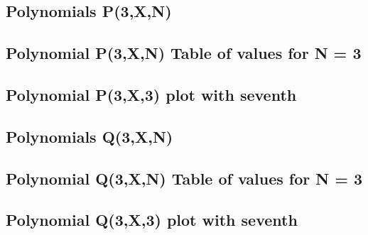 \documentclass[12pt,letterpaper,oneside,reqno]{amsart}
\begin{document}
    \subsection{Polynomials P(3,X,N)}
    

    \subsection{Polynomial P(3,X,N) Table of values for N = 3}
    

    \subsection{Polynomial P(3,X,3) plot with seventh}
    

    \subsection{Polynomials Q(3,X,N)}
    

    \subsection{Polynomial Q(3,X,N) Table of values for N = 3}
    

    \subsection{Polynomial Q(3,X,3) plot with seventh}
    


%    
%    
\end{document}
